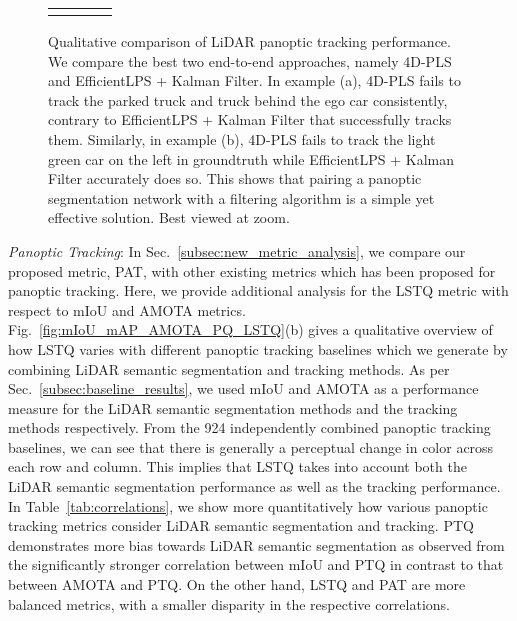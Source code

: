 \documentclass[letterpaper, 10 pt, journal, twoside]{IEEEtran}
\newcommand{\tableref}[1]{Table~\ref{#1}}
\newcommand{\secref}[1]{Sec.~\ref{#1}}
\newcommand{\figref}[1]{Fig.~\ref{#1}}
\begin{document}
\begin{figure*}
{\begin{tabular}{P{0.4cm}P{5.5cm}P{5.5cm}P{5.5cm}}
\\
{}& &  &  \\
\end{tabular}}
\caption{Qualitative comparison of LiDAR panoptic tracking performance. We compare the best two end-to-end approaches, namely 4D-PLS and EfficientLPS + Kalman Filter. In example (a), 4D-PLS fails to track the parked truck and truck behind the ego car consistently, contrary to EfficientLPS + Kalman Filter that successfully tracks them. Similarly, in example (b), 4D-PLS fails to track the light green car on the left in groundtruth while EfficientLPS + Kalman Filter accurately does so. This shows that pairing a panoptic segmentation network with a filtering algorithm is a simple yet effective solution. Best viewed at  zoom.}
\label{fig:tracking_ablation}
\end{figure*}

\noindent\textit{Panoptic Tracking}: In \secref{subsec:new_metric_analysis}, we compare our proposed metric, PAT, with other existing metrics which has been proposed for panoptic tracking. Here, we provide additional analysis for the LSTQ metric with respect to mIoU and AMOTA metrics. \figref{fig:mIoU_mAP_AMOTA_PQ_LSTQ}(b) gives a qualitative overview of how LSTQ varies with different panoptic tracking baselines which we generate by combining LiDAR semantic segmentation and tracking methods. As per \secref{subsec:baseline_results}, we used mIoU and AMOTA as a performance measure for the LiDAR semantic segmentation methods and the tracking methods respectively. From the 924 independently combined panoptic tracking baselines, we can see that there is generally a perceptual change in color across each row and column. This implies that LSTQ takes into account both the LiDAR semantic segmentation performance as well as the tracking performance. In \tableref{tab:correlations}, we show more quantitatively how various panoptic tracking metrics consider LiDAR semantic segmentation and tracking. PTQ demonstrates more bias towards LiDAR semantic segmentation as observed from the significantly stronger correlation between mIoU and PTQ in contrast to that between AMOTA and PTQ. On the other hand, LSTQ and PAT are more balanced metrics, with a smaller disparity in the respective correlations.
\end{document}
